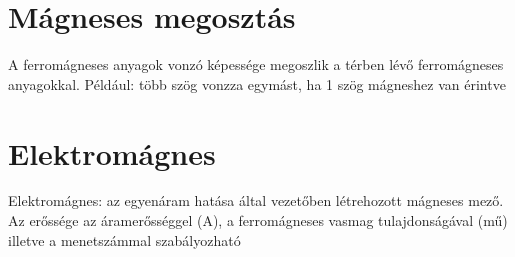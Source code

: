 \documentclass [12pt,a4paper] {article}
\begin{document}
\section{Mágneses megosztás}
A ferromágneses anyagok vonzó képessége megoszlik a térben lévő ferromágneses anyagokkal. Például: több szög vonzza egymást, ha 1 szög mágneshez van érintve

\section{Elektromágnes}
Elektromágnes: az egyenáram hatása által vezetőben létrehozott mágneses mező. Az erőssége az áramerősséggel (A), a ferromágneses vasmag tulajdonságával (mű) illetve a menetszámmal szabályozható 
\end{document}
